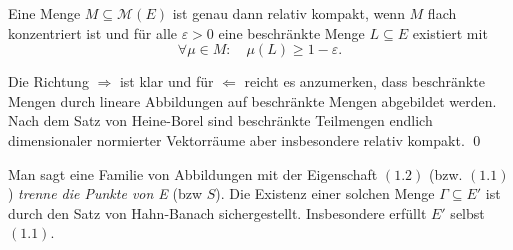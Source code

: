\begin{corollary}
    Eine Menge $M \subseteq \mathcal{M}(E)$ ist genau dann relativ kompakt, wenn $M$ flach konzentriert ist und für alle $\varepsilon > 0$ eine beschränkte Menge $L \subseteq E$ existiert mit
    $$
        \forall \mu \in M: \quad \mu(L) \geq 1 - \varepsilon. 
    $$
\end{corollary}

\begin{proof*}
    Die Richtung $\Rightarrow$ ist klar und für $\Leftarrow$ reicht es anzumerken, dass beschränkte Mengen durch lineare Abbildungen auf beschränkte Mengen abgebildet werden. Nach dem Satz von Heine-Borel sind 
    beschränkte Teilmengen endlich dimensionaler normierter Vektorräume aber insbesondere relativ kompakt. \qed 
\end{proof*}

\begin{remark}%
    Man sagt eine Familie von Abbildungen mit der Eigenschaft $(1.2)$ (bzw. $(1.1)$ ) \textit{trenne die Punkte von E} (bzw $S$). Die Existenz einer solchen Menge $\Gamma \subseteq E'$ ist durch den Satz von Hahn-Banach sichergestellt. 
    Insbesondere erfüllt $E'$ selbst$(1.1)$. 
\end{remark}